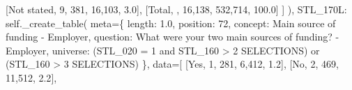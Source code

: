 \documentclass[
  11pt,
  a4paper,
]{article}
\newenvironment{Shaded}{\begin{snugshade}}{\end{snugshade}}
\newcommand{\NormalTok}[1]{\textcolor[rgb]{0.00,0.23,0.31}{#1}}
\newcommand{\OperatorTok}[1]{\textcolor[rgb]{0.37,0.37,0.37}{#1}}
\newcommand{\StringTok}[1]{\textcolor[rgb]{0.13,0.47,0.30}{#1}}
\newcommand{\VariableTok}[1]{\textcolor[rgb]{0.07,0.07,0.07}{#1}}
\begin{document}
\begin{Shaded}
\begin{Highlighting}[]
\NormalTok{                    [}\StringTok{\textquotesingle{}Not stated\textquotesingle{}}\NormalTok{, }\StringTok{\textquotesingle{}9\textquotesingle{}}\NormalTok{, }\StringTok{\textquotesingle{}381\textquotesingle{}}\NormalTok{, }\StringTok{\textquotesingle{}16,103\textquotesingle{}}\NormalTok{, }\StringTok{\textquotesingle{}3.0\textquotesingle{}}\NormalTok{],}
\NormalTok{                    [}\StringTok{\textquotesingle{}Total\textquotesingle{}}\NormalTok{, }\StringTok{\textquotesingle{}\textquotesingle{}}\NormalTok{, }\StringTok{\textquotesingle{}16,138\textquotesingle{}}\NormalTok{, }\StringTok{\textquotesingle{}532,714\textquotesingle{}}\NormalTok{, }\StringTok{\textquotesingle{}100.0\textquotesingle{}}\NormalTok{]}
\NormalTok{                ]}
\NormalTok{            ),}
            \StringTok{\textquotesingle{}STL\_170L\textquotesingle{}}\NormalTok{: }\VariableTok{self}\NormalTok{.\_create\_table(}
\NormalTok{                meta}\OperatorTok{=}\NormalTok{\{}
                    \StringTok{\textquotesingle{}length\textquotesingle{}}\NormalTok{: }\StringTok{\textquotesingle{}1.0\textquotesingle{}}\NormalTok{, }\StringTok{\textquotesingle{}position\textquotesingle{}}\NormalTok{: }\StringTok{\textquotesingle{}72\textquotesingle{}}\NormalTok{,}
                    \StringTok{\textquotesingle{}concept\textquotesingle{}}\NormalTok{: }\StringTok{\textquotesingle{}Main source of funding {-} Employer\textquotesingle{}}\NormalTok{,}
                    \StringTok{\textquotesingle{}question\textquotesingle{}}\NormalTok{: }\StringTok{\textquotesingle{}What were your two main sources of funding? {-} Employer\textquotesingle{}}\NormalTok{,}
                    \StringTok{\textquotesingle{}universe\textquotesingle{}}\NormalTok{: }\StringTok{\textquotesingle{}(STL\_020 = 1 and STL\_160 \textgreater{} 2 SELECTIONS) or (STL\_160 \textgreater{} 3 SELECTIONS)\textquotesingle{}}
\NormalTok{                \},}
\NormalTok{                data}\OperatorTok{=}\NormalTok{[}
\NormalTok{                    [}\StringTok{\textquotesingle{}Yes\textquotesingle{}}\NormalTok{, }\StringTok{\textquotesingle{}1\textquotesingle{}}\NormalTok{, }\StringTok{\textquotesingle{}281\textquotesingle{}}\NormalTok{, }\StringTok{\textquotesingle{}6,412\textquotesingle{}}\NormalTok{, }\StringTok{\textquotesingle{}1.2\textquotesingle{}}\NormalTok{],}
\NormalTok{                    [}\StringTok{\textquotesingle{}No\textquotesingle{}}\NormalTok{, }\StringTok{\textquotesingle{}2\textquotesingle{}}\NormalTok{, }\StringTok{\textquotesingle{}469\textquotesingle{}}\NormalTok{, }\StringTok{\textquotesingle{}11,512\textquotesingle{}}\NormalTok{, }\StringTok{\textquotesingle{}2.2\textquotesingle{}}\NormalTok{],}

\end{Highlighting}
\end{Shaded}
\end{document}
